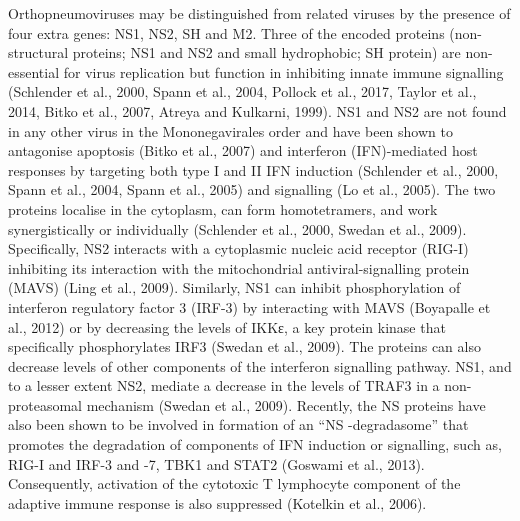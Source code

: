 Orthopneumoviruses may be distinguished from related viruses by the presence of four extra genes: NS1, NS2, SH and M2. Three of the encoded proteins (non-structural proteins; NS1 and NS2 and small hydrophobic; SH protein) are non-essential for virus replication but function in inhibiting innate immune signalling (Schlender et al., 2000, Spann et al., 2004, Pollock et al., 2017, Taylor et al., 2014, Bitko et al., 2007, Atreya and Kulkarni, 1999). NS1 and NS2 are not found in any other virus in the Mononegavirales order and have been shown to antagonise apoptosis (Bitko et al., 2007) and interferon (IFN)-mediated host responses by targeting both type I and II IFN induction (Schlender et al., 2000, Spann et al., 2004, Spann et al., 2005) and signalling (Lo et al., 2005). The two proteins localise in the cytoplasm, can form homotetramers, and work synergistically or individually (Schlender et al., 2000, Swedan et al., 2009). Specifically, NS2 interacts with a cytoplasmic nucleic acid receptor (RIG-I) inhibiting its interaction with the mitochondrial antiviral-signalling protein (MAVS) (Ling et al., 2009). Similarly, NS1 can inhibit phosphorylation of interferon regulatory factor 3 (IRF-3) by interacting with MAVS (Boyapalle et al., 2012) or by decreasing the levels of IKKε, a key protein kinase that specifically phosphorylates IRF3 (Swedan et al., 2009). The proteins can also decrease levels of other components of the interferon signalling pathway. NS1, and to a lesser extent NS2, mediate a decrease in the levels of TRAF3 in a non-proteasomal mechanism (Swedan et al., 2009). Recently, the NS proteins have also been shown to be involved in formation of an “NS -degradasome” that promotes the degradation of components of IFN induction or signalling, such as, RIG-I and IRF-3 and -7, TBK1 and STAT2 (Goswami et al., 2013). Consequently, activation of the cytotoxic T lymphocyte component of the adaptive immune response is also suppressed (Kotelkin et al., 2006).

